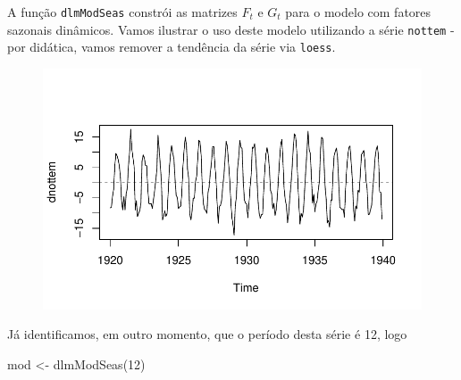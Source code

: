 \documentclass[
  letterpaper,
  DIV=11,
  numbers=noendperiod]{scrreprt}
\newenvironment{Shaded}{\begin{snugshade}}{\end{snugshade}}
\newcommand{\AttributeTok}[1]{\textcolor[rgb]{0.40,0.45,0.13}{#1}}
\newcommand{\DecValTok}[1]{\textcolor[rgb]{0.68,0.00,0.00}{#1}}
\newcommand{\FunctionTok}[1]{\textcolor[rgb]{0.28,0.35,0.67}{#1}}
\newcommand{\NormalTok}[1]{\textcolor[rgb]{0.00,0.23,0.31}{#1}}
\newcommand{\OtherTok}[1]{\textcolor[rgb]{0.00,0.23,0.31}{#1}}
\newcommand{\SpecialCharTok}[1]{\textcolor[rgb]{0.37,0.37,0.37}{#1}}
\begin{document}
A função \texttt{dlmModSeas} constrói as matrizes \(F_t\) e \(G_t\) para
o modelo com fatores sazonais dinâmicos. Vamos ilustrar o uso deste
modelo utilizando a série \texttt{nottem} - por didática, vamos remover
a tendência da série via \texttt{loess}.

\begin{Shaded}
\end{Shaded}

\begin{figure}[H]

{\centering \includegraphics{sazonal_files/figure-pdf/unnamed-chunk-2-1.pdf}

}

\end{figure}

Já identificamos, em outro momento, que o período desta série é 12, logo

\begin{Shaded}
\begin{Highlighting}[]
\NormalTok{mod }\OtherTok{\textless{}{-}} \FunctionTok{dlmModSeas}\NormalTok{(}\DecValTok{12}\NormalTok{)}
\end{Highlighting}
\end{Shaded}
\end{document}
